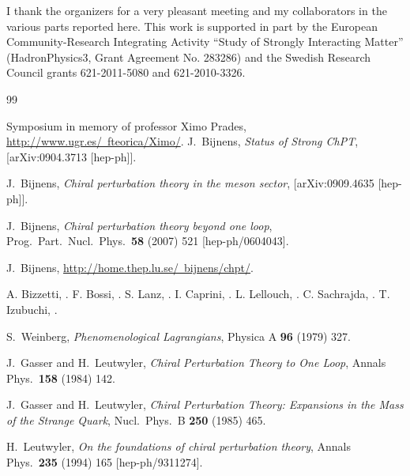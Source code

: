 \documentclass[cits,hyper]{PoS}
\begin{document}
\acknowledgments
I thank the organizers for a very pleasant meeting and my collaborators in the
various parts reported here.
This work is supported in part by the European Community-Research
Integrating Activity ``Study of Strongly Interacting Matter''
(HadronPhysics3, Grant Agreement No. 283286)
and the Swedish Research Council grants 621-2011-5080 and 621-2010-3326.

\begin{thebibliography}{99}
\setlength{\itemsep}{0cm}

 Symposium in memory of professor Ximo Prades,
\href{http://www.ugr.es/~fteorica/Ximo/}{http://www.ugr.es/~fteorica/Ximo/}.
  J.~Bijnens,
  \emph{Status of Strong ChPT},
  [arXiv:0904.3713 [hep-ph]].

  J.~Bijnens,
  \emph{Chiral perturbation theory in the meson sector},
  [arXiv:0909.4635 [hep-ph]].

  J.~Bijnens,
  \emph{Chiral perturbation theory beyond one loop},
  {Prog.\ Part.\ Nucl.\ Phys.}\  {\bf 58} (2007) 521
  [hep-ph/0604043].

  J.~Bijnens, \href{http://home.thep.lu.se/~bijnens/chpt/}{http://home.thep.lu.se/~bijnens/chpt/}.

 A. Bizzetti, .
 F. Bossi, .
 S. Lanz, .
 I. Caprini, .
 L. Lellouch, .
 C. Sachrajda, .
 T. Izubuchi, .

  S.~Weinberg,
  \emph{Phenomenological Lagrangians},
  Physica A {\bf 96} (1979) 327.

  J.~Gasser and H.~Leutwyler,
  \emph{Chiral Perturbation Theory to One Loop},
  Annals Phys.\  {\bf 158} (1984) 142.

 J.~Gasser and H.~Leutwyler,
  \emph{Chiral Perturbation Theory: Expansions in the Mass of the Strange Quark},
  Nucl.\ Phys.\ B {\bf 250} (1985) 465.

 H.~Leutwyler,
  \emph{On the foundations of chiral perturbation theory},
  Annals Phys.\  {\bf 235} (1994) 165
  [hep-ph/9311274].


\end{thebibliography}
\end{document}
